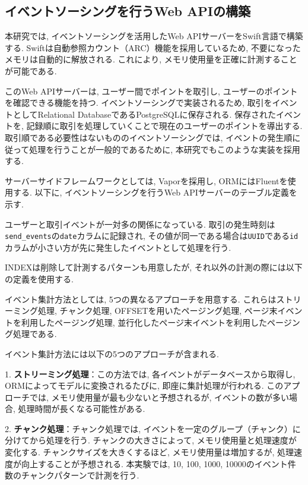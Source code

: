 \documentclass[../../../main]{subfiles}
\begin{document}
    \subsection{イベントソーシングを行うWeb APIの構築}\label{subsec:method-event_sourcing_api}

    本研究では, イベントソーシングを活用したWeb APIサーバーをSwift言語で構築する. Swiftは自動参照カウント（ARC）機能を採用しているため, 不要になったメモリは自動的に解放される. これにより, メモリ使用量を正確に計測することが可能である.

    このWeb APIサーバーは, ユーザー間でポイントを取引し, ユーザーのポイントを確認できる機能を持つ. イベントソーシングで実装されるため, 取引をイベントとしてRelational DatabaseであるPostgreSQLに保存される. 保存されたイベントを, 記録順に取引を処理していくことで現在のユーザーのポイントを導出する. 取引順である必要性はないもののイベントソーシングでは, イベントの発生順に従って処理を行うことが一般的であるために, 本研究でもこのような実装を採用する.

    サーバーサイドフレームワークとしては, Vaporを採用し, ORMにはFluentを使用する. 以下に, イベントソーシングを行うWeb APIサーバーのテーブル定義を示す.

    

    ユーザーと取引イベントが一対多の関係になっている. 取引の発生時刻は\texttt{send\_events}の\texttt{date}カラムに記録され, その値が同一である場合は\texttt{UUID}である\texttt{id}カラムが小さい方が先に発生したイベントとして処理を行う.

    INDEXは削除して計測するパターンも用意したが, それ以外の計測の際には以下の定義を使用する.

    

    イベント集計方法としては, 5つの異なるアプローチを用意する. これらはストリーミング処理, チャンク処理, OFFSETを用いたページング処理, ページ末イベントを利用したページング処理, 並行化したページ末イベントを利用したページング処理である.

    イベント集計方法には以下の5つのアプローチが含まれる.

    1. \textbf{ストリーミング処理}：この方法では, 各イベントがデータベースから取得し, ORMによってモデルに変換されるたびに, 即座に集計処理が行われる. このアプローチでは, メモリ使用量が最も少ないと予想されるが, イベントの数が多い場合, 処理時間が長くなる可能性がある.

    2. \textbf{チャンク処理}：チャンク処理では, イベントを一定のグループ（チャンク）に分けてから処理を行う. チャンクの大きさによって, メモリ使用量と処理速度が変化する. チャンクサイズを大きくするほど, メモリ使用量は増加するが, 処理速度が向上することが予想される. 本実験では, 10, 100, 1000, 10000のイベント件数のチャンクパターンで計測を行う.
\end{document}
